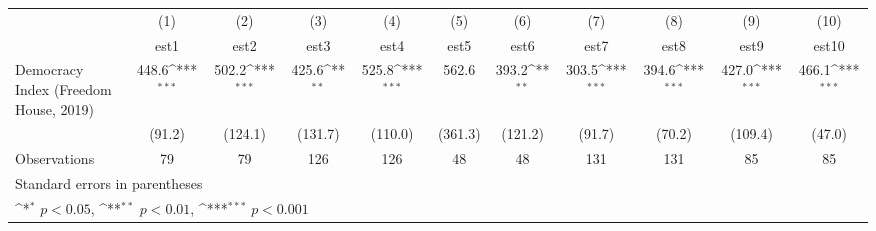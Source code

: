 {
\def\sym#1{\ifmmode^{#1}\else\(^{#1}\)\fi}
\begin{tabular}{l*{10}{c}}
\hline\hline
                    &\multicolumn{1}{c}{(1)}         &\multicolumn{1}{c}{(2)}         &\multicolumn{1}{c}{(3)}         &\multicolumn{1}{c}{(4)}         &\multicolumn{1}{c}{(5)}         &\multicolumn{1}{c}{(6)}         &\multicolumn{1}{c}{(7)}         &\multicolumn{1}{c}{(8)}         &\multicolumn{1}{c}{(9)}         &\multicolumn{1}{c}{(10)}         \\
                    &        est1         &        est2         &        est3         &        est4         &        est5         &        est6         &        est7         &        est8         &        est9         &       est10         \\
\hline
Democracy Index (Freedom House, 2019)&       448.6\sym{***}&       502.2\sym{***}&       425.6\sym{**} &       525.8\sym{***}&       562.6         &       393.2\sym{**} &       303.5\sym{***}&       394.6\sym{***}&       427.0\sym{***}&       466.1\sym{***}\\
                    &      (91.2)         &     (124.1)         &     (131.7)         &     (110.0)         &     (361.3)         &     (121.2)         &      (91.7)         &      (70.2)         &     (109.4)         &      (47.0)         \\
\hline
Observations        &          79         &          79         &         126         &         126         &          48         &          48         &         131         &         131         &          85         &          85         \\
\hline\hline
\multicolumn{11}{l}{\footnotesize Standard errors in parentheses}\\
\multicolumn{11}{l}{\footnotesize \sym{*} \(p<0.05\), \sym{**} \(p<0.01\), \sym{***} \(p<0.001\)}\\
\end{tabular}
}
